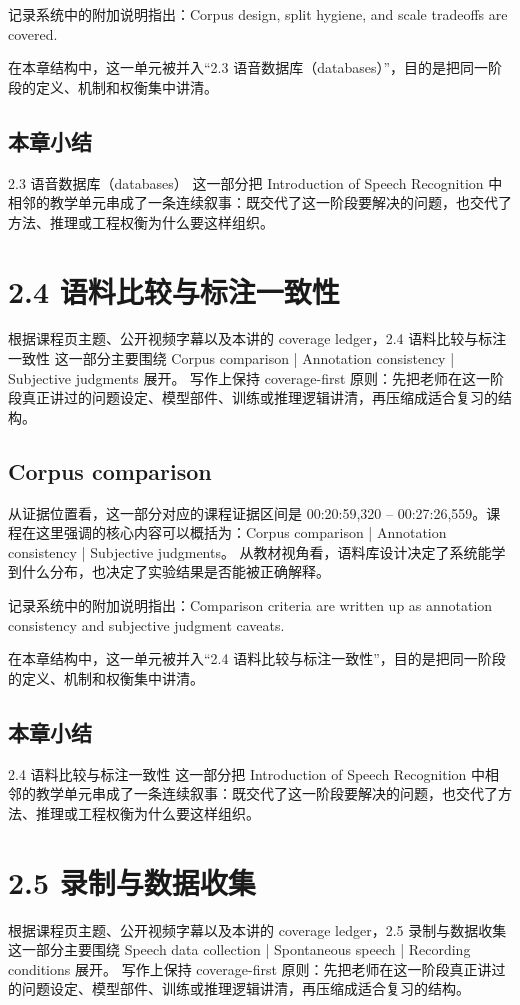 \documentclass[a4paper]{article}
\begin{document}
记录系统中的附加说明指出：Corpus design, split hygiene, and scale tradeoffs are covered.

在本章结构中，这一单元被并入“2.3 语音数据库（databases）”，目的是把同一阶段的定义、机制和权衡集中讲清。

\subsection{本章小结}
2.3 语音数据库（databases） 这一部分把 Introduction of Speech Recognition 中相邻的教学单元串成了一条连续叙事：既交代了这一阶段要解决的问题，也交代了方法、推理或工程权衡为什么要这样组织。

\section{2.4 语料比较与标注一致性}
根据课程页主题、公开视频字幕以及本讲的 coverage ledger，2.4 语料比较与标注一致性 这一部分主要围绕 Corpus comparison | Annotation consistency | Subjective judgments 展开。
写作上保持 coverage-first 原则：先把老师在这一阶段真正讲过的问题设定、模型部件、训练或推理逻辑讲清，再压缩成适合复习的结构。

\subsection{Corpus comparison}
从证据位置看，这一部分对应的课程证据区间是 00:20:59,320 -- 00:27:26,559。课程在这里强调的核心内容可以概括为：Corpus comparison | Annotation consistency | Subjective judgments。
从教材视角看，语料库设计决定了系统能学到什么分布，也决定了实验结果是否能被正确解释。

记录系统中的附加说明指出：Comparison criteria are written up as annotation consistency and subjective judgment caveats.

在本章结构中，这一单元被并入“2.4 语料比较与标注一致性”，目的是把同一阶段的定义、机制和权衡集中讲清。

\subsection{本章小结}
2.4 语料比较与标注一致性 这一部分把 Introduction of Speech Recognition 中相邻的教学单元串成了一条连续叙事：既交代了这一阶段要解决的问题，也交代了方法、推理或工程权衡为什么要这样组织。

\section{2.5 录制与数据收集}
根据课程页主题、公开视频字幕以及本讲的 coverage ledger，2.5 录制与数据收集 这一部分主要围绕 Speech data collection | Spontaneous speech | Recording conditions 展开。
写作上保持 coverage-first 原则：先把老师在这一阶段真正讲过的问题设定、模型部件、训练或推理逻辑讲清，再压缩成适合复习的结构。
\end{document}
